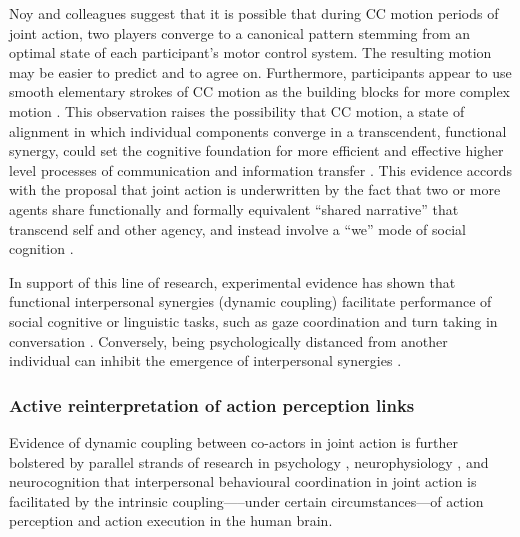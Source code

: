 \begin{CJK}{UTF8}{gbsn}
Noy and colleagues suggest that it is possible that during CC motion periods of joint action, two players converge to a canonical pattern stemming from an optimal state of each participant’s motor control system.  The resulting motion may be easier to predict and to agree on. Furthermore, participants appear to use smooth elementary strokes of CC motion as the building blocks for more complex motion \citep{Noy2017}.  This observation raises the possibility that CC motion, a state of alignment in which individual components converge in a transcendent, functional synergy, could set the cognitive foundation for more efficient and effective higher level processes of communication and information transfer \citep[15]{Lerique2016}.  This evidence accords with the proposal that joint action is underwritten by the fact that two or more agents share functionally and formally equivalent ``shared narrative'' that transcend self and other agency, and instead involve a ``we'' mode of social cognition \citep{Gallotti2013}.

In support of this line of research, experimental evidence has shown that functional interpersonal synergies (dynamic coupling) facilitate performance of social cognitive or linguistic tasks, such as gaze coordination and turn taking in conversation \citep{Miles2010,Richardson2005,Shockley2009}.  Conversely, being psychologically distanced from another individual can inhibit the emergence of interpersonal synergies \citep{Miles2010}.







\subsubsection{Active reinterpretation of action perception links}
Evidence of dynamic coupling between co-actors in joint action is further bolstered by parallel strands of research in psychology \citep{Prinz1990,Prinz1997,Prinz2013}, neurophysiology \citep{Rizzolatti2004,Rizzolatti2010}, and neurocognition \citep{Wolpert1998,Wolpert2000} that interpersonal behavioural coordination in joint action is facilitated by the intrinsic coupling—--under certain circumstances---of action perception and action execution in the human brain.


\end{CJK}
